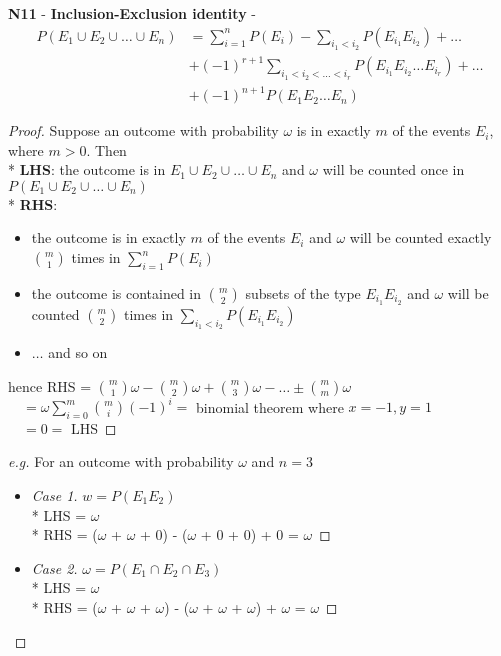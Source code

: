 \documentclass[10pt, landscape]{article}
\begin{document}
\begin{multicols*}{3}
  \textbf{N11} - \textbf{Inclusion-Exclusion identity} - 
  \begin{align*}
    P(E_1 \cup E_2 \cup \dots \cup E_n) &= \sum\limits^n_{i=1} P(E_i) - \sum\limits_{i_1 < i_2} P(E_{i_1} E_{i_2}) + \dots \\
                                        &+ (-1)^{r+1} \sum_{i_1 < i_2 < \dots < i_r} P(E_{i_1} E_{i_2} \dots E_{i_r}) + \dots \\
                                        &+ (-1)^{n+1} P(E_1 E_2 \dots E_n)
  \end{align*}
  \begin{proof}
    Suppose an outcome with probability $\omega$ is in exactly $m$ of the events $E_i$, where $m > 0$. Then
    \\* \textbf{LHS}: the outcome is in $E_1\cup E_2 \cup \dots \cup E_n$ and $\omega$ will be counted once in $P(E_1\cup E_2 \cup \dots \cup E_n)$ 
    \\* \textbf{RHS}: 
    \begin{itemize}
      \item the outcome is in exactly $m$ of the events $E_i$ and $\omega$ will be counted exactly $\binom{m}{1}$ times in $\sum\limits^n_{i=1}P(E_i)$
      \item the outcome is contained in $\binom{m}{2}$ subsets of the type $E_{i_1}E_{i_2}$ 
        and $\omega$ will be counted $\binom{m}{2}$ times in $\sum\limits_{i_1 < i_2} P(E_{i_1} E_{i_2})$ 
      \item $\dots$ and so on 
    \end{itemize}
    hence RHS = $\binom{m}{1}\omega - \binom{m}{2}\omega + \binom{m}{3}\omega - \dots \pm \binom{m}{m}\omega $
    \\ $\quad = \omega \sum\limits^m_{i=0}\binom{m}{i} (-1)^i = $ binomial theorem where $x=-1, y=1$ 
    \\ $\quad = 0 = $ LHS
  \end{proof}
  \begin{proof}[e.g]
    For an outcome with probability $\omega$ and $n=3$
    \begin{itemize}
      \item 
        \begin{proof}[Case 1] $w = P(E_1E_2)$
          \\* LHS = $\omega$
          \\* RHS = ($\omega$ + $\omega$ + 0) - ($\omega$ + 0 + 0) + 0 = $\omega$
        \end{proof}
      \item 
        \begin{proof}[Case 2] $\omega = P(E_1 \cap E_2 \cap E_3)$
          \\* LHS = $\omega$
          \\* RHS = ($\omega$ + $\omega$ + $\omega$) - ($\omega$ + $\omega$ + $\omega$) + $\omega$ = $\omega$
        \end{proof}
    \end{itemize}
  \end{proof}


\end{multicols*}
\end{document}
